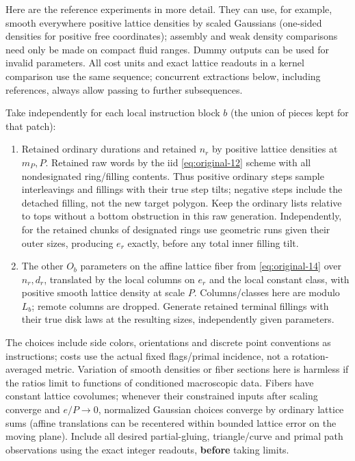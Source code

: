 \begin{definition}\label{kern:reference}

Here are the reference experiments in more detail. They can use, for example, smooth everywhere positive
lattice densities by scaled Gaussians (one-sided densities for positive free coordinates); assembly and weak
density comparisons need only be made on compact fluid ranges. Dummy outputs can be used for invalid
parameters. All cost units and exact lattice readouts in a kernel comparison use the same sequence;
concurrent extractions below, including references, always allow passing to further subsequences.

Take independently for each local instruction block \(b\) (the union of pieces kept for that patch):
\begin{enumerate}
\item Retained ordinary durations and retained \(n_r\) by positive lattice densities at \(m_P,P\). Retained raw words by the iid \eqref{eq:original-12} scheme with all nondesignated ring/filling contents. Thus positive ordinary steps sample interleavings and fillings with their true step tilts; negative steps include the detached filling, not the new target polygon. Keep the ordinary lists relative to tops without a bottom obstruction in this raw generation. Independently, for the retained chunks of designated rings use geometric runs given their outer sizes, producing \(e_r\) exactly, before any total inner filling tilt.
\item The other \(O_b\) parameters on the affine lattice fiber from \eqref{eq:original-14} over \(n_r,d_r\), translated by the local columns on \(e_r\) and the local constant class, with positive smooth lattice density at scale \(P\). Columns/classes here are modulo \(L_b\); remote columns are dropped. Generate retained terminal fillings with their true disk laws at the resulting sizes, independently given parameters.
\end{enumerate}

The choices include side colors, orientations and discrete point conventions as instructions; costs use the
actual fixed flags/primal incidence, not a rotation-averaged metric. Variation of smooth densities or fiber
sections here is harmless if the ratios limit to functions of conditioned macroscopic data. Fibers have
constant lattice covolumes; whenever their constrained inputs after scaling converge and \(e/P\to 0\),
normalized Gaussian choices converge by ordinary lattice sums (affine translations can be recentered within
bounded lattice error on the moving plane). Include all desired partial-gluing, triangle/curve and primal
path observations using the exact integer readouts, \textbf{before} taking limits.

\end{definition}

